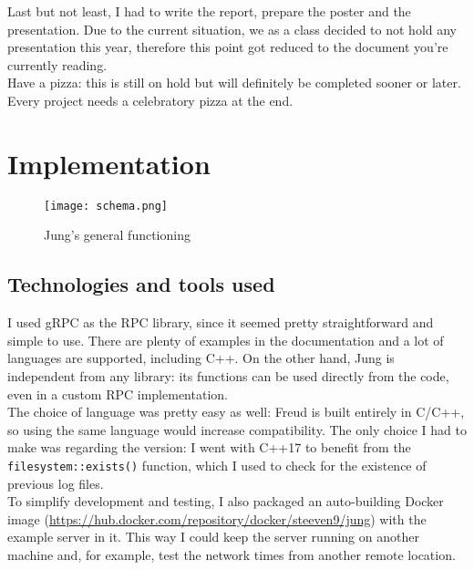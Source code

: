         Last but not least, I had to write the report, prepare the poster and the presentation. Due to the current
        situation, we as a class decided to not hold any presentation this year, therefore this point got reduced
        to the document you're currently reading.\\
        
        Have a pizza: this is still on hold but will definitely be completed sooner or later. Every project needs
        a celebratory pizza at the end.
        

\chapter{Implementation}

    \begin{figure}[H]
        \centering
        \texttt{[image: schema.png]}
        \caption{Jung's general functioning}
        \label{fig:schema}
    \end{figure}
    

    \section{Technologies and tools used}

        I used gRPC \cite{gRPCdocs} as the RPC library, since it seemed pretty straightforward and simple
        to use. There are plenty of examples in the documentation and a lot of languages are supported,
        including C++. On the other hand, Jung is independent from any library:
        its functions can be used directly from the code, even in a custom RPC implementation.\\

        The choice of language was pretty easy as well: Freud is built entirely in C/C++, so using the same
        language would increase compatibility. The only choice I had to make was regarding the version:
        I went with C++17 to benefit from the \texttt{filesystem::exists()} function, which I used to check
        for the existence of previous log files.\\

        To simplify development and testing, I also packaged an auto-building Docker image 
        (\url{https://hub.docker.com/repository/docker/steeven9/jung}) with the example server in it.
        This way I could keep the server running on another machine and, for example, test the network times
        from another remote location.


